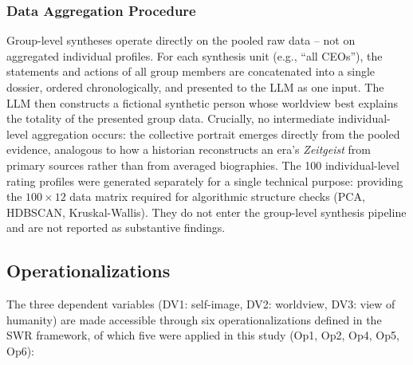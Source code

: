 \documentclass[12pt,a4paper]{article}
\begin{document}
\subsubsection{Data Aggregation Procedure}

Group-level syntheses operate directly on the pooled raw data -- not on aggregated individual profiles. For each synthesis unit (e.g., ``all CEOs''), the statements and actions of all group members are concatenated into a single dossier, ordered chronologically, and presented to the LLM as one input. The LLM then constructs a fictional synthetic person whose worldview best explains the totality of the presented group data. Crucially, no intermediate individual-level aggregation occurs: the collective portrait emerges directly from the pooled evidence, analogous to how a historian reconstructs an era's \emph{Zeitgeist} from primary sources rather than from averaged biographies. The 100 individual-level rating profiles were generated separately for a single technical purpose: providing the $100 \times 12$ data matrix required for algorithmic structure checks (PCA, HDBSCAN, Kruskal-Wallis). They do not enter the group-level synthesis pipeline and are not reported as substantive findings.


\subsection{Operationalizations}
\label{sec:methodik:ops}

The three dependent variables (DV1: self-image, DV2: worldview, DV3: view of humanity) are made accessible through six operationalizations defined in the SWR framework, of which five were applied in this study (Op1, Op2, Op4, Op5, Op6):
\end{document}
